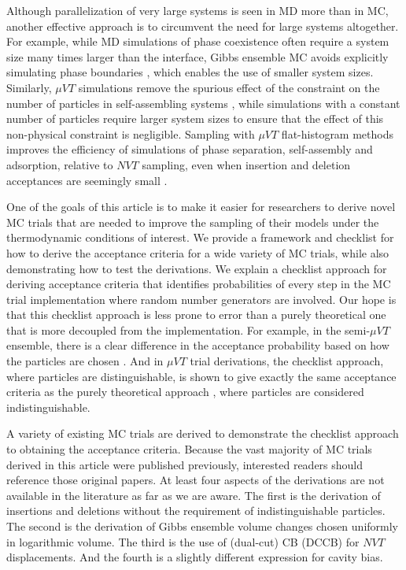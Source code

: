 Although parallelization of very large systems is seen in MD more than in MC, another effective approach is to circumvent the need for large systems altogether.
For example, while MD simulations of phase coexistence often require a system size many times larger than the interface, Gibbs ensemble MC avoids explicitly simulating phase boundaries \cite{panagiotopoulos_direct_1987}, which enables the use of smaller system sizes.
Similarly, $\mu VT$ simulations remove the spurious effect of the constraint on the number of particles in self-assembling systems \cite{floriano_micellization_1999, hatch_computational_2015}, while simulations with a constant number of particles require larger system sizes to ensure that the effect of this non-physical constraint is negligible.
Sampling with $\mu VT$ flat-histogram methods improves the efficiency of simulations of phase separation, self-assembly and adsorption, relative to $NVT$ sampling, even when insertion and deletion acceptances are seemingly small \cite{hatch_efficiency_2023}.

One of the goals of this article is to make it easier for researchers to derive novel MC trials that are needed to improve the sampling of their models under the thermodynamic conditions of interest.
We provide a framework and checklist for how to derive the acceptance criteria for a wide variety of MC trials, while also demonstrating how to test the derivations.
We explain a checklist approach for deriving acceptance criteria that identifies probabilities of every step in the MC trial implementation where random number generators are involved.
Our hope is that this checklist approach is less prone to error than a purely theoretical one that is more decoupled from the implementation.
For example, in the semi-$\mu VT$ ensemble, there is a clear difference in the acceptance probability based on how the particles are chosen \cite{kofke_monte_1988}.
And in $\mu VT$ trial derivations, the checklist approach, where particles are distinguishable, is shown to give exactly the same acceptance criteria as the purely theoretical approach \cite{frenkel_understanding_2002}, where particles are considered indistinguishable.

A variety of existing MC trials are derived to demonstrate the checklist approach to obtaining the acceptance criteria.
Because the vast majority of MC trials derived in this article were published previously, interested readers should reference those original papers.
At least four aspects of the derivations are not available in the literature as far as we are aware.
The first is the derivation of insertions and deletions without the requirement of indistinguishable particles.
The second is the derivation of Gibbs ensemble volume changes chosen uniformly in logarithmic volume.
The third is the use of (dual-cut) CB (DCCB) \cite{vlugt_improving_1998} for $NVT$ displacements.
And the fourth is a slightly different expression for cavity bias.

